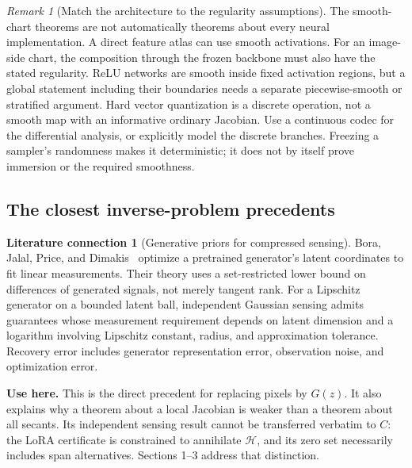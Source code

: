 \documentclass[11pt,a4paper]{article}
\theoremstyle{definition}
\theoremstyle{definition}
\newtheorem{literature}[theorem]{Literature connection}
\theoremstyle{remark}\newtheorem{remark}[theorem]{Remark}
\newcommand{\HH}{\mathcal H}\newcommand{\XX}{\mathcal X}\newcommand{\col}{\operatorname{col}}
\begin{document}
\begin{remark}[Match the architecture to the regularity assumptions]
The smooth-chart theorems are not automatically theorems about every neural implementation. A direct feature atlas can use smooth activations. For an image-side chart, the composition through the frozen backbone must also have the stated regularity. ReLU networks are smooth inside fixed activation regions, but a global statement including their boundaries needs a separate piecewise-smooth or stratified argument. Hard vector quantization is a discrete operation, not a smooth map with an informative ordinary Jacobian. Use a continuous codec for the differential analysis, or explicitly model the discrete branches. Freezing a sampler's randomness makes it deterministic; it does not by itself prove immersion or the required smoothness.
\end{remark}

\subsection{The closest inverse-problem precedents}

\begin{literature}[Generative priors for compressed sensing]\label{lit:bora}
Bora, Jalal, Price, and Dimakis~\cite{bora} optimize a pretrained generator's latent coordinates to fit linear measurements. Their theory uses a set-restricted lower bound on differences of generated signals, not merely tangent rank. For a Lipschitz generator on a bounded latent ball, independent Gaussian sensing admits guarantees whose measurement requirement depends on latent dimension and a logarithm involving Lipschitz constant, radius, and approximation tolerance. Recovery error includes generator representation error, observation noise, and optimization error.

\textbf{Use here.} This is the direct precedent for replacing pixels by $G(z)$. It also explains why a theorem about a local Jacobian is weaker than a theorem about all secants. Its independent sensing result cannot be transferred verbatim to $C$: the LoRA certificate is constrained to annihilate $\HH$, and its zero set necessarily includes span alternatives. Sections 1--3 address that distinction.
\end{literature}
\end{document}
